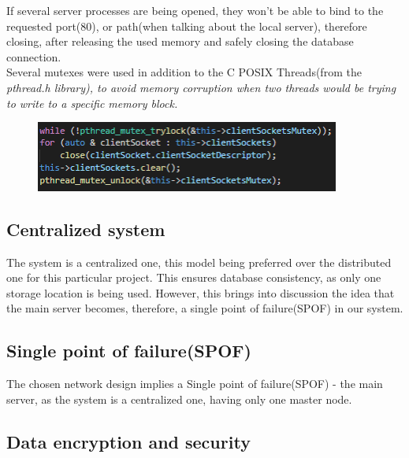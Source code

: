 \documentclass[runningheads]{llncs}
\begin{document}
If several server processes are being opened, they won't be able to bind to the requested port(80), or path(when talking about the local server), therefore closing, after releasing the used memory and safely closing the database connection.\\
Several mutexes were used in addition to the C POSIX Threads(from the \it {pthread.h} library), to avoid memory corruption when two threads would be trying to write to a specific memory block.\\
\begin{figure}[H]
\centering
\includegraphics[width=100mm]{Mutex.png}
\end{figure}

\subsection{Centralized system}
The system is a centralized one, this model being preferred over the distributed one for this particular project. This ensures database consistency, as only one storage location is being used. However, this brings into discussion the idea that the main server becomes, therefore, a single point of failure(SPOF) in our system.

\subsection{Single point of failure(SPOF)}
The chosen network design implies a Single point of failure(SPOF) - the main server, as the system is a centralized one, having only one master node.

\subsection{Data encryption and security}
\end{document}
